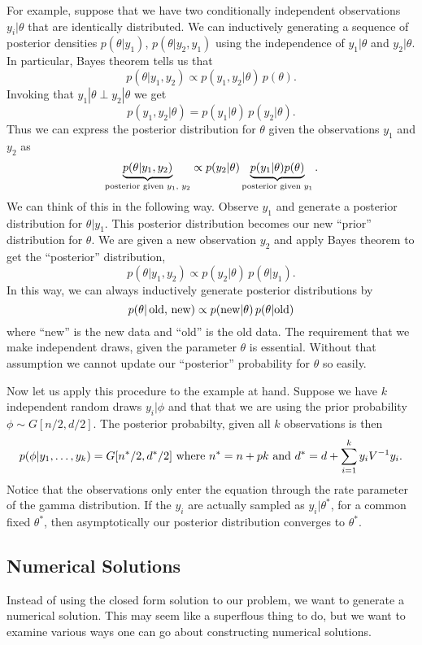\documentclass{report}
\begin{document}
For example, suppose that we have two conditionally independent observations $y_i | \theta$ that are identically distributed.  We can inductively generating a sequence of posterior densities $p(\theta | y_1)$, $p(\theta| y_2, y_1)$ using the independence of $y_1 | \theta$ and $y_2 | \theta$.  In particular, Bayes theorem tells us that
\[
p(\theta | y_1, y_2) \propto p(y_1, y_2 | \theta) \, p(\theta).
\]
Invoking that $y_1 | \theta \perp y_2 | \theta$ we get
\[
p(y_1, y_2 | \theta) = p(y_1 | \theta) \, p(y_2 | \theta).
\]
Thus we can express the posterior distribution for $\theta$ given the observations $y_1$ and $y_2$ as
\[
\underbrace{p(\theta | y_1, y_2)}_{\textmd{posterior given $y_1$, $y_2$}}
\propto p(y_2 | \theta) 
\underbrace{p(y_1 | \theta) p(\theta)}_{\textmd{posterior given $y_1$}}.
\]
We can think of this in the following way.  Observe $y_1$ and generate a posterior distribution for $\theta | y_1$.  This posterior distribution becomes our new ``prior'' distribution for $\theta$.  We are given a new observation $y_2$ and apply Bayes theorem to get the ``posterior'' distribution,
\[
p(\theta | y_1, y_2) \propto p(y_2 | \theta) \, p(\theta | y_1).
\]
In this way, we can always inductively generate posterior distributions by
\[
p(\theta | \, \textmd{old, new}) \propto p(\textmd{new} | \theta) \, p(\theta | \textmd{old})
\]
where ``new'' is the new data and ``old'' is the old data.  The requirement that we make independent draws, given the parameter $\theta$ is essential.  Without that assumption we cannot update our ``posterior'' probability for $\theta$ so easily.

Now let us apply this procedure to the example at hand.  Suppose we have $k$ independent random draws $y_i | \phi$ and that that we are using the prior probability $\phi \sim G[n/2, d/2]$.  The posterior probabilty, given all $k$ observations is then
\[
p(\phi | y_1, \ldots, y_k) = G[n^*/2, d^*/2] \textmd{ where } n^* = n+ pk \textmd{ and } d^* = d + \sum_{i=1}^k
  y_i V^{-1} y_i.
\]
Notice that the observations only enter the equation through the rate parameter of the gamma distribution.  If the $y_i$ are actually sampled as $y_i | \theta^*$, for a common fixed $\theta^*$, then asymptotically our posterior distribution converges to $\theta^*$.

\subsection{Numerical Solutions}

Instead of using the closed form solution to our problem, we want to generate a numerical solution.  This may seem like a superflous thing to do, but we want to examine various ways one can go about constructing numerical solutions.
\end{document}
